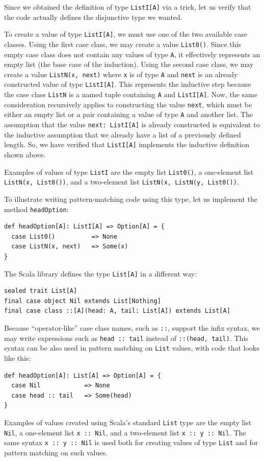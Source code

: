 Since we obtained the definition of type \lstinline!ListI[A]! via
a trick, let us verify that the code actually defines the disjunctive
type we wanted. 

To create a value of type \lstinline!ListI[A]!, we must use one of
the two available case classes. Using the first case class, we may
create a value \lstinline!List0()!. Since this empty case class does
not contain any values of type \lstinline!A!, it effectively represents
an empty list (the base case of the induction). Using the second case
class, we may create a value \lstinline!ListN(x, next)! where \lstinline!x!
is of type \lstinline!A! and \lstinline!next! is an already constructed
value of type \lstinline!ListI[A]!. This represents the inductive
step because the case class \lstinline!ListN! is a named tuple containing
\lstinline!A! and \lstinline!ListI[A]!. Now, the same consideration
recursively applies to constructing the value \lstinline!next!, which
must be either an empty list or a pair containing a value of type
\lstinline!A! and another list. The assumption that the value \lstinline!next: ListI[A]!
is already constructed is equivalent to the inductive assumption that
we already have a list of a previously defined length. So, we have
verified that \lstinline!ListI[A]! implements the inductive definition
shown above.

Examples of values of type \lstinline!ListI! are the empty list \lstinline!List0()!,
a one-element list \lstinline!ListN(x, List0())!, and a two-element
list \lstinline!ListN(x, ListN(y, List0())!.

To illustrate writing pattern-matching code using this type, let us
implement the method \lstinline!headOption!:
\begin{lstlisting}
def headOption[A]: ListI[A] => Option[A] = {
  case List0()          => None
  case ListN(x, next)   => Some(x)
}
\end{lstlisting}

The Scala library  defines the type \lstinline!List[A]! in a  different
way:
\begin{lstlisting}
sealed trait List[A]
final case object Nil extends List[Nothing]
final case class ::[A](head: A, tail: List[A]) extends List[A]
\end{lstlisting}
Because \textsf{``}operator-like\textsf{''} case class names, such as \lstinline!::!,
support the infix syntax, we may write expressions such as \lstinline!head :: tail!
instead of \lstinline!::(head, tail)!. This syntax can be also used
in pattern matching on \lstinline!List! values, with code that looks
like this:
\begin{lstlisting}
def headOption[A]: List[A] => Option[A] = {
  case Nil            => None
  case head :: tail   => Some(head)
}
\end{lstlisting}
Examples of values created using Scala\textsf{'}s standard \lstinline!List!
type are the empty list \lstinline!Nil!, a one-element list \lstinline!x :: Nil!,
and a two-element list \lstinline!x :: y :: Nil!. The same syntax
\lstinline!x :: y :: Nil! is used both for creating values of type
\lstinline!List! and for pattern matching on such values. 


